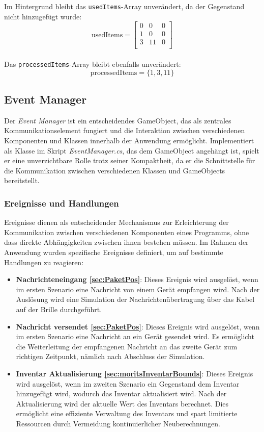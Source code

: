 Im Hintergrund bleibt das \texttt{usedItems}-Array unverändert, da der Gegenstand nicht hinzugefügt wurde:
\[
\text{usedItems} =
\left[
\begin{array}{ccccc}
0 & 0 & 0 \\
1 & 0 & 0 \\
3 & 11 & 0 \\
\end{array}
\right]
\]
\\
Das \texttt{processedItems}-Array bleibt ebenfalls unverändert:
\[
\text{processedItems} = \{1, 3, 11\}
\]




\subsection{\label{sec:eventmanager}Event Manager}

Der \textit{Event Manager} ist ein entscheidendes GameObject, das als zentrales Kommunikationselement fungiert und die
Interaktion zwischen verschiedenen Komponenten und Klassen innerhalb der Anwendung ermöglicht. Implementiert als Klasse
im Skript \textit{EventManager.cs}, das dem GameObject angehängt ist, spielt er eine unverzichtbare Rolle trotz seiner
Kompaktheit, da er die Schnittstelle für die Kommunikation zwischen verschiedenen Klassen und GameObjects bereitstellt.


\subsubsection*{Ereignisse und Handlungen}

Ereignisse dienen als entscheidender Mechanismus zur Erleichterung der Kommunikation zwischen verschiedenen Komponenten eines Programms, ohne dass direkte Abhängigkeiten zwischen ihnen bestehen müssen. Im Rahmen der Anwendung wurden spezifische Ereignisse definiert, um auf bestimmte Handlungen zu reagieren:

\begin{itemize}
    \item \textbf{Nachrichteneingang \ref{sec:PaketPos}}: Dieses Ereignis wird ausgelöst, wenn im ersten Szenario eine Nachricht von einem Gerät empfangen wird. Nach der Auslösung wird eine Simulation der Nachrichtenübertragung über das Kabel auf der Brille durchgeführt.
    \item \textbf{Nachricht versendet \ref{sec:PaketPos}}: Dieses Ereignis wird ausgelöst, wenn im ersten Szenario eine Nachricht an ein Gerät gesendet wird. Es ermöglicht die Weiterleitung der empfangenen Nachricht an das zweite Gerät zum richtigen Zeitpunkt, nämlich nach Abschluss der Simulation.
    \item \textbf{Inventar Aktualisierung \ref{sec:moritsInventarBounds}}: Dieses Ereignis wird ausgelöst, wenn im zweiten Szenario ein Gegenstand dem Inventar hinzugefügt wird, wodurch das Inventar aktualisiert wird. Nach der Aktualisierung wird der aktuelle Wert des Inventars berechnet. Dies ermöglicht eine effiziente Verwaltung des Inventars und spart limitierte Ressourcen durch Vermeidung kontinuierlicher Neuberechnungen.
\end{itemize}


